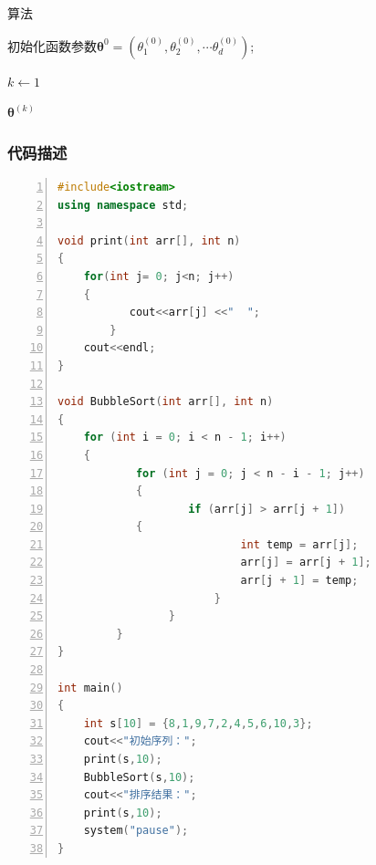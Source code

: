 \documentclass[cs4size,a4paper]{ctexart}
\numberwithin{equation}{section}
\numberwithin{table}{section}
\numberwithin{figure}{section}
\begin{document}
\begin{algorithm}[H]
\caption{算法}\label{algorithm}
初始化函数参数$\mathbf{\theta}^{0}=(\theta_1 ^{(0)},\theta_2 ^{(0)},\cdots \theta_d ^{(0)})$;

$k\leftarrow 1$\;

  
\Return $\mathbf{\theta}^{(k)}$ \;
\end{algorithm} 


\subsubsection{代码描述}
\begin{lstlisting}[language={c++},
        numbers=left,
        numberstyle=\tiny\monaco,
        basicstyle=\footnotesize\monaco]
#include<iostream>
using namespace std;
 
void print(int arr[], int n)
{  
    for(int j= 0; j<n; j++)
	{  
           cout<<arr[j] <<"  ";  
        }  
    cout<<endl;  
}  
 
void BubbleSort(int arr[], int n)
{
    for (int i = 0; i < n - 1; i++)
	{
            for (int j = 0; j < n - i - 1; j++)
	        {
                    if (arr[j] > arr[j + 1]) 
			{
                            int temp = arr[j];
                            arr[j] = arr[j + 1];
                            arr[j + 1] = temp;
                        }
                 }
         }
}
 
int main()
{  
    int s[10] = {8,1,9,7,2,4,5,6,10,3};  
    cout<<"初始序列：";  
    print(s,10);  
    BubbleSort(s,10);  
    cout<<"排序结果：";  
    print(s,10);  
    system("pause"); 
}
\end{lstlisting}
\end{document}
